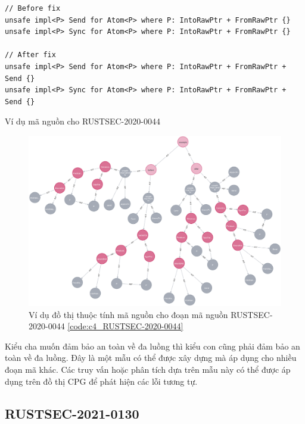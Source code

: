 \begin{listing}[H]
\begin{verbatim}
// Before fix
unsafe impl<P> Send for Atom<P> where P: IntoRawPtr + FromRawPtr {}
unsafe impl<P> Sync for Atom<P> where P: IntoRawPtr + FromRawPtr {}

// After fix
unsafe impl<P> Send for Atom<P> where P: IntoRawPtr + FromRawPtr + Send {}
unsafe impl<P> Sync for Atom<P> where P: IntoRawPtr + FromRawPtr + Send {}
\end{verbatim}
\caption{Ví dụ mã nguồn cho RUSTSEC-2020-0044}
\label{code:c4_RUSTSEC-2020-0044}
\end{listing}

\begin{figure}[H]
    \includegraphics[width=1\columnwidth]{figures/c4/c4_RUSTSEC-2020-0044.png}
    \centering
    \caption{Ví dụ đồ thị thuộc tính mã nguồn cho đoạn mã nguồn RUSTSEC-2020-0044 \ref{code:c4_RUSTSEC-2020-0044}}
    \label{img:c4_RUSTSEC-2020-0044}
\end{figure}

Kiểu cha muốn đảm bảo an toàn về đa luồng thì kiểu con cũng phải đảm bảo an toàn về đa luồng. Đây là một mẫu có thể được xây dựng mà áp dụng cho nhiều đoạn mã khác. Các truy vấn hoặc phân tích dựa trên mẫu này có thể được áp dụng trên đồ thị CPG để phát hiện các lỗi tương tự.

\subsection{RUSTSEC-2021-0130}

